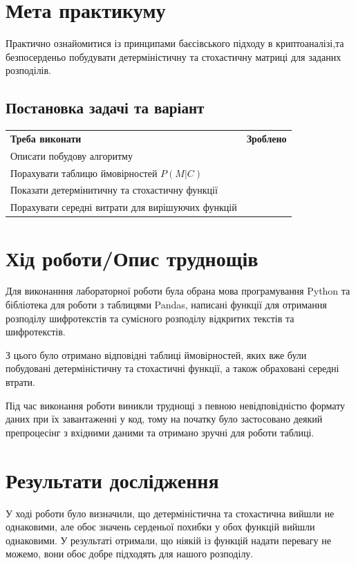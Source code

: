 \section{Мета практикуму}

Практично ознайомитися із принципами баєсівського підходу в криптоаналізі,та безпосерденьо побудувати детерміністичну та стохастичну матриці для заданих розподілів. 


\subsection{Постановка задачі та варіант}
\begin{tabularx}{\textwidth}{X|X}
	\textbf{Треба виконати} & \textbf{Зроблено} \\
	Описати побудову алгоритму & \checkmark \\
	Порахувати таблицю ймовірностей $P(\textit{M}|\textit{C})$ & \checkmark \\
	Показати детермінитичну та стохастичну функції & \checkmark \\
	Порахувати середні витрати для вирішуючих функцій & \checkmark \\
\end{tabularx}



\section{Хід роботи/Опис труднощів}
    Для виконанння лабораторної роботи була обрана мова програмування Python та бібліотека для роботи з таблицями Pandas, написані функції для отримання розподілу шифротекстів та сумісного розподілу відкритих текстів та шифротекстів. 
    
    З цього було отримано відповідні таблиці ймовірностей, яких вже були побудовані детерміністичну та стохастичні функції, а також обраховані середні втрати. 
    
    Під час виконання роботи виникли труднощі з певною невідповідністю формату даних при їх завантаженні у код, тому на початку було застосовано деякий препроцесінг з вхідними даними та отримано зручні для роботи таблиці.


\section{Результати дослідження}
У ході роботи було визначили, що детерміністична та стохастична вийшли не однаковими, але обоє значень серденьої похибки у обох функцій вийшли однаковими. У результаті отримали, що ніякій із функцій надати перевагу не можемо, вони обоє добре підходять для нашого розподілу.

